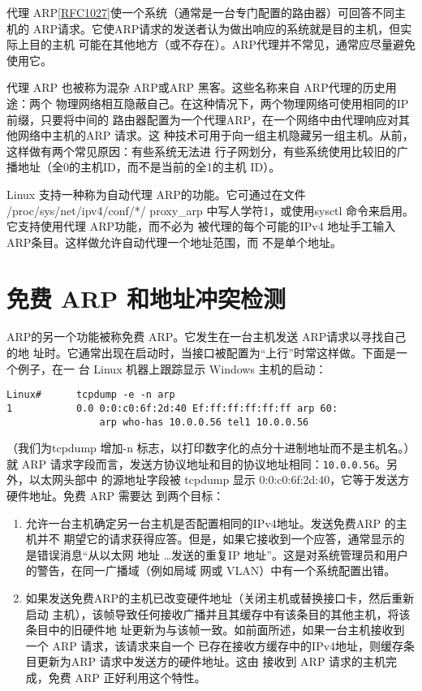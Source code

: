 代理
ARP\href{https://www.rfc-editor.org/rfc/rfc1027}{[RFC1027]}使一个系统（通常是一台专门配置的路由器）可回答不同主机的
ARP请求。它使ARP请求的发送者认为做出响应的系统就是目的主机，但实际上目的主机
可能在其他地方（或不存在）。ARP代理并不常见，通常应尽量避免使用它。

代理 ARP 也被称为混杂 ARP或ARP 黑客。这些名称来自 ARP代理的历史用途：两个
物理网络相互隐蔽自己。在这种情况下，两个物理网络可使用相同的IP前缀，只要将中间的
路由器配置为一个代理ARP，在一个网络中由代理响应对其他网络中主机的ARP 请求。这
种技术可用于向一组主机隐藏另一组主机。从前，这样做有两个常见原因：有些系统无法进
行子网划分，有些系统使用比较旧的广播地址（全0的主机ID，而不是当前的全1的主机
ID）。

Linux 支持一种称为自动代理 ARP的功能。它可通过在文件 /proc/sys/net/ipv4/conf/*/
proxy\_arp 中写人学符1，或使用sysctl 命令来启用。它支持使用代理 ARP功能，而不必为
被代理的每个可能的IPv4 地址手工输入 ARP条目。这样做允许自动代理一个地址范围，而
不是单个地址。

\section{免费 ARP 和地址冲突检测}

ARP的另一个功能被称免费 ARP。它发生在一台主机发送 ARP请求以寻找自己的地
址时。它通常出现在启动时，当接口被配置为“上行”时常这样做。下面是一个例子，在一
台 Linux 机器上跟踪显示 Windows 主机的启动：

\begin{verbatim}
Linux#      tcpdump -e -n arp
1           0.0 0:0:c0:6f:2d:40 Ef:ff:ff:ff:ff:ff arp 60:
                arp who-has 10.0.0.56 tel1 10.0.0.56
\end{verbatim}

（我们为tcpdump 增加-n 标志，以打印数字化的点分十进制地址而不是主机名。）就
ARP 请求字段而言，发送方协议地址和目的协议地址相同：\verb|10.0.0.56|。另外，以太网头部中
的源地址字段被 tcpdump 显示 0:0:c0:6f:2d:40，它等于发送方硬件地址。免费 ARP 需要达
到两个目标：

\begin{enumerate}
  \item 允许一台主机确定另一台主机是否配置相同的IPv4地址。发送免费ARP 的主机并不
    期望它的请求获得应答。但是，如果它接收到一个应答，通常显示的是错误消息“从以太网
    地址 \dots 发送的重复IP 地址”。这是对系统管理员和用户的警告，在同一广播域（例如局域
    网或 VLAN）中有一个系统配置出错。

  \item 如果发送免费ARP的主机已改变硬件地址（关闭主机或替换接口卡，然后重新启动
    主机），该帧导致任何接收广播并且其缓存中有该条目的其他主机，将该条目中的旧硬件地
    址更新为与该帧一致。如前面所述，如果一台主机接收到一个 ARP 请求，该请求来自一个
    已存在接收方缓存中的IPv4地址，则缓存条目更新为ARP 请求中发送方的硬件地址。这由
    接收到 ARP 请求的主机完成，免费 ARP 正好利用这个特性。
\end{enumerate}

